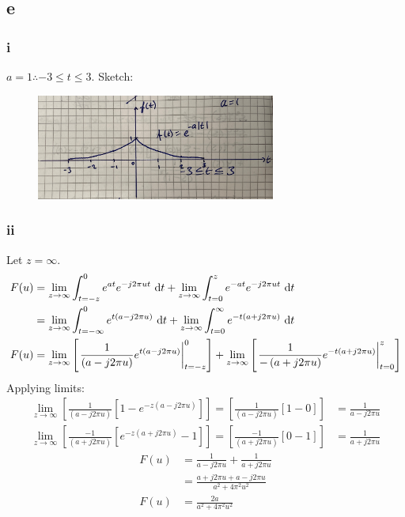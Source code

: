 \documentclass[11pt]{article}
\numberwithin{equation}{section}
\begin{document}
\subsection*{e}
\subsubsection*{i}
$a =1 \therefore -3 \leq t \leq 3$. Sketch:
\begin{figure}[H]
	\centering
	\includegraphics[width = 0.7\textwidth]{./img/q1ei.JPG}
	\caption{}
\end{figure}
\subsubsection*{ii}
Let $z = \infty$.
\begin{align}
	F(u) &= \lim_{z\rightarrow \infty} \int_{t=-z}^{0}e^{at}e^{-j2\pi u t}  \,\dif t + \lim_{z\rightarrow \infty}\int_{t=0}^{z} e^{-at} e^{-j2\pi u t}\,\dif t\\
	&= \lim_{z\rightarrow \infty} \int_{t=-\infty}^{0}e^{t(a - j2\pi u)}  \,\dif t + \lim_{z\rightarrow \infty} \int_{t=0}^{\infty} e^{-t(a + j2\pi u)}\,\dif t\\
	F(u) &= \lim_{z\rightarrow \infty} \left[ \left. \frac{1}{\left(a - j2\pi u\right)}e^{t\left(a - j2\pi u\right)} \right|_{t = -z}^0 \right] + \lim_{z\rightarrow \infty} \left[ \left. \frac{1}{-\left(a + j2\pi u\right)}e^{-t\left(a + j2\pi u\right)} \right|_{t=0}^z \right]
\end{align}
Applying limits:
\begin{align}
	\lim_{z\rightarrow \infty} \left[ \frac{1}{\left(a - j2\pi u\right)} \left[ 1 - e^{-z\left(a - j2\pi u\right)} \right] \right] = \left[ \frac{1}{\left(a - j2\pi u\right)} \left[ 1 - 0 \right] \right] &= \frac{1}{a - j2\pi u}\\
	\lim_{z\rightarrow \infty} \left[ \frac{-1}{\left(a + j2\pi u\right)} \left[ e^{-z\left( a + j2\pi u\right)} -1 \right]\right] = \left[ \frac{-1}{\left(a + j2\pi u\right)} \left[ 0 -1 \right]\right] &= \frac{1}{a + j2\pi u}
\end{align}
\begin{align}
	F(u) &= \frac{1}{a - j2\pi u} + \frac{1}{a + j2\pi u}\\
	&= \frac{a + j2\pi u + a - j2\pi u}{a^2 + 4\pi^2 u^2}\\
	F(u) &= \frac{2a}{a^2 + 4\pi^2u^2}
\end{align}
\end{document}
